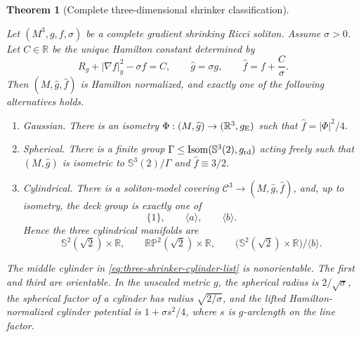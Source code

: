 \documentclass[10pt]{coll-l}
\newcommand{\Isom}{\operatorname{Isom}}
\newcommand{\R}{\mathbb{R}}
\newcommand{\Sph}{\mathbb{S}}
\newtheorem{theorem}{Theorem}[chapter]
\theoremstyle{definition}
\theoremstyle{remark}
\numberwithin{section}{chapter}
\numberwithin{equation}{chapter}
\begin{document}
\begin{theorem}[Complete three-dimensional shrinker classification]
\label{thm:complete-three-dimensional-shrinker-classification}
\leavevmode\par\noindent
Let $(M^3,g,f,\sigma)$ be a complete gradient shrinking Ricci soliton.
Assume $\sigma>0$.  Let $C\in\R$ be the unique Hamilton constant determined by
\begin{equation}
        R_g+|\nabla f|_g^2-\sigma f=C,
        \qquad
        \widehat g=\sigma g,
        \qquad
        \widehat f=f+\frac C\sigma .                    \label{eq:three-shrinker-normalization}
\end{equation}
Then $(M,\widehat g,\widehat f)$ is Hamilton normalized, and exactly one of
the following alternatives holds.
\begin{enumerate}
\item \emph{Gaussian.}  There is an isometry
      $\Phi:(M,\widehat g)\to(\R^3,g_{\rm E})$ such that
      $\widehat f=|\Phi|^2/4$.
\item \emph{Spherical.}  There is a finite group
      $\Gamma\leq\Isom(\Sph^3(2),g_{\rm rd})$ acting freely such that
      $(M,\widehat g)$ is isometric to $\Sph^3(2)/\Gamma$ and
      $\widehat f\equiv3/2$.
\item \emph{Cylindrical.}  There is a soliton-model covering
      $\mathcal C^3\to(M,\widehat g,\widehat f)$, and, up to isometry, the
      deck group is exactly one of
      \begin{equation}
          \{1\},\qquad \langle a\rangle,
                 \qquad \langle b\rangle.               \label{eq:three-shrinker-cylinder-deck-list}
      \end{equation}
      Hence the three cylindrical manifolds are
      \begin{equation}
       \Sph^2(\sqrt2)\times\R,\qquad
       \mathbb{RP}^2(\sqrt2)\times\R,\qquad
       \bigl(\Sph^2(\sqrt2)\times\R\bigr)/\langle b\rangle.
                                                               \label{eq:three-shrinker-cylinder-list}
      \end{equation}
\end{enumerate}
The middle cylinder in \eqref{eq:three-shrinker-cylinder-list} is
nonorientable.  The first and third are orientable.  In the unscaled metric
$g$, the spherical radius is $2/\sqrt\sigma$, the spherical factor of a
cylinder has radius $\sqrt{2/\sigma}$, and the lifted Hamilton-normalized
cylinder potential is $1+\sigma s^2/4$, where $s$ is $g$-arclength on the
line factor.
\end{theorem}
\end{document}
